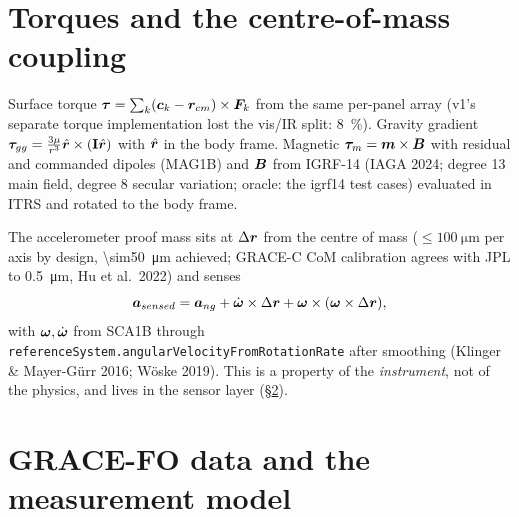 \section{Torques and the centre-of-mass coupling}
Surface torque $\bm{\tau}=\sum_k(\bm{c}_k-\bm{r}_{cm})\times\bm{F}_k$ from the same per-panel array (v1's separate torque implementation lost the vis/IR split: \SI{8}{\percent}). Gravity gradient $\bm{\tau}_{gg}=\frac{3\mu}{r^3}\hat{\bm{r}}\times(\mathbf I\hat{\bm{r}})$ with $\hat{\bm{r}}$ in the body frame. Magnetic $\bm{\tau}_{m}=\bm{m}\times\bm{B}$ with residual and commanded dipoles (MAG1B) and $\bm{B}$ from IGRF-14 (IAGA 2024; degree 13 main field, degree 8 secular variation; oracle: the igrf14 test cases) evaluated in ITRS and rotated to the body frame.

The accelerometer proof mass sits at $\Delta\bm{r}$ from the centre of mass ($\le\SI{100}{\micro\metre}$ per axis by design, \SI{\sim50}{\micro\metre} achieved; GRACE-C CoM calibration agrees with JPL to \SI{0.5}{\micro\metre}, Hu et al.\ 2022) and senses
\begin{equation}
\bm{a}_{sensed}=\bm{a}_{ng}+\dot{\bm{\omega}}\times\Delta\bm{r}+\bm{\omega}\times(\bm{\omega}\times\Delta\bm{r}),
\end{equation}
with $\bm{\omega},\dot{\bm{\omega}}$ from SCA1B through \texttt{referenceSystem.angularVelocityFromRotationRate} after smoothing (Klinger \& Mayer-Gürr 2016; Wöske 2019). This is a property of the \emph{instrument}, not of the physics, and lives in the sensor layer (\S\ref{sec:sensors}).

\section{GRACE-FO data and the measurement model}\label{sec:sensors}
